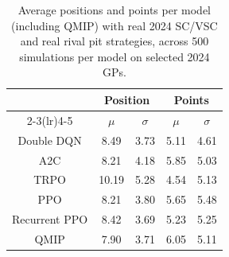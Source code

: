 \begin{table}[H]
\centering
\begin{tabular}{ccccc}
\toprule
\multicolumn{1}{l}{}               & \multicolumn{2}{c}{Position}   & \multicolumn{2}{c}{Points} \\ \cmidrule(lr){2-3}\cmidrule(lr){4-5}
\multicolumn{1}{c}{Model}          &    $\mu$ & $\sigma$ &   $\mu$  & $\sigma$ \\ \midrule
\multicolumn{1}{c}{Double DQN    } &     8.49  &     3.73  &     5.11  &     4.61  \\
\multicolumn{1}{c}{A2C           } &     8.21  &     4.18  &     5.85  &     5.03  \\
\multicolumn{1}{c}{TRPO          } &    10.19  &     5.28  &     4.54  &     5.13  \\
\multicolumn{1}{c}{PPO           } &     8.21  &     3.80  &     5.65  &     5.48  \\
\multicolumn{1}{c}{Recurrent PPO } &     8.42  &     3.69  &     5.23  &     5.25  \\
\multicolumn{1}{c}{QMIP          } &     7.90  &     3.71  &     6.05  &     5.11  \\
\bottomrule
\end{tabular}
\caption{Average positions and points per model (including QMIP) with real 2024 SC/VSC and real rival pit strategies, across 500 simulations per model on selected 2024 GPs.}
\label{tab:tab_all_gps_2024_with_qmip}
\end{table}
